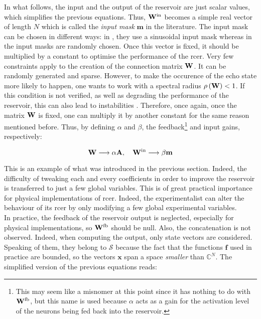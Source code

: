 In what follows, the input and the output of the reservoir are just scalar values, which simplifies the previous equations. Thus, $\mathbf{W}^{\text{in}}$ becomes a simple real vector of length $N$ which is called the \textit{input mask} $\mathbf{m}$ in the literature. The input mask can be chosen in different ways: in \cite{Duport2016}, they use a sinusoidal input mask whereas in \cite{Antonik2017, Vinckier2015, Paquot2012} the input masks are randomly chosen. Once this vector is fixed, it should be multiplied by a constant to optimise the performance of the \gls{rcer}. Very few constraints apply to the creation of the connection matrix $\mathbf{W}$. It can be randomly generated and sparse. However, to make the occurence of the echo state more likely to happen, one wants to work with a spectral radius $\rho \left( \mathbf{W} \right)<1$. If this condition is not verified, as well as degrading the performance of the reservoir, this can also lead to instabilities \cite{Lukoeviius2009}. Therefore, once again, once the matrix $\mathbf{W}$ is fixed, one can multiply it by another constant for the same reason mentioned before. Thus, by defining $\alpha$ and $\beta$,  the feedback\footnote{This may seem like a misnomer at this point since it has nothing to do with $\mathbf{W}^{\text{fb}}$, but this name is used because $\alpha$ acts as a gain for the activation level of the neurons being fed back into the reservoir.} and input gains, respectively:

\begin{equation}
	\mathbf{W} \longrightarrow \alpha \mathbf{A}, \quad \mathbf{W}^{\text{in}} \longrightarrow \beta \mathbf{m}
\end{equation}

This is an example of what was introduced in the previous section. Indeed, the difficulty of tweaking each and every coefficients in order to improve the reservoir is transferred to just a few global variables. This is of great practical importance for physical implementations of \gls{rcer}. Indeed, the experimentalist can alter the behaviour of its \gls{rcer} by only modifying a few global experimental variables.\\

In practice, the feedback of the reservoir output is neglected, especially for physical implementations, so $\mathbf{W}^{\text{fb}}$ should be null. Also, the concatenation is not observed. Indeed, when computing the output, only state vectors are considered. Speaking of them, they belong to $\mathcal{S}$ because the fact that the functions $\mathbf{f}$ used in practice are bounded, so the vectors $\mathbf{x}$ span a space \textit{smaller} than $\mathbb{C}^N$. The simplified version of the previous equations reads:

